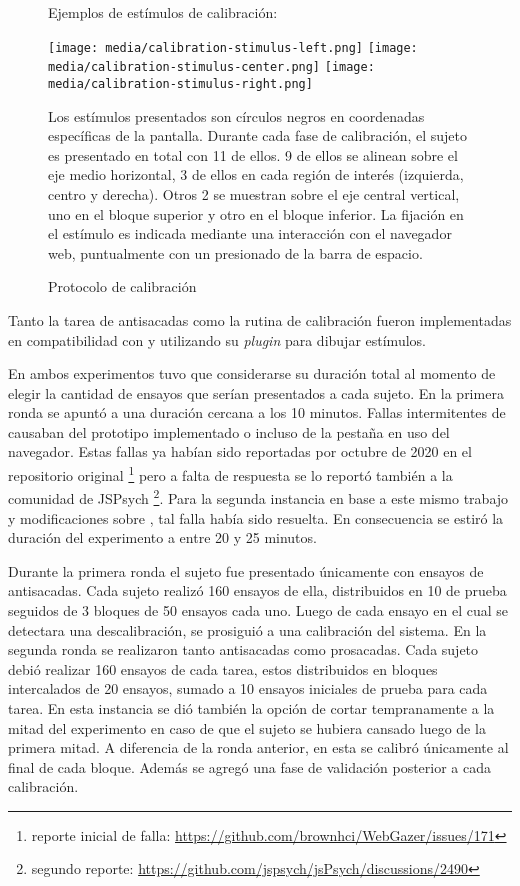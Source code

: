   \begin{figure}
    \centering

    Ejemplos de estímulos de calibración:

    \texttt{[image: media/calibration-stimulus-left.png]}
    \texttt{[image: media/calibration-stimulus-center.png]}
    \texttt{[image: media/calibration-stimulus-right.png]}

    Los estímulos presentados son círculos negros en coordenadas específicas de
    la pantalla.
    Durante cada fase de calibración, el sujeto es presentado en total con 11
    de ellos.
    9 de ellos se alinean sobre el eje medio horizontal, 3 de ellos en cada
    región de interés (izquierda, centro y derecha).
    Otros 2 se muestran sobre el eje central vertical, uno en el bloque
    superior y otro en el bloque inferior.
    La fijación en el estímulo es indicada mediante una interacción con el
    navegador web, puntualmente con un presionado de la barra de espacio.

    \caption{Protocolo de calibración}
    \label{fig:calibration-protocol}
  \end{figure}

  Tanto la tarea de antisacadas como la rutina de calibración fueron
  implementadas en compatibilidad con \jspsych y utilizando su \textit{plugin}
  \psychophysics para dibujar estímulos.

  En ambos experimentos tuvo que considerarse su duración total al momento de 
  elegir la cantidad de ensayos que serían presentados a cada sujeto.
  En la primera ronda se apuntó a una duración cercana a los 10 minutos.
  Fallas intermitentes de \webgazer causaban \crashes del prototipo implementado
  o incluso de la pestaña en uso del navegador.
  Estas fallas ya habían sido reportadas por octubre de 2020 en el repositorio
  original \footnote{reporte inicial de falla:
  \url{https://github.com/brownhci/WebGazer/issues/171}} pero a falta de
  respuesta se lo reportó también a la comunidad de JSPsych \footnote{segundo
  reporte: \url{https://github.com/jspsych/jsPsych/discussions/2490}}.
  Para la segunda instancia en base a este mismo trabajo y modificaciones sobre
  \webgazer, tal falla había sido resuelta.
  En consecuencia se estiró la duración del experimento a entre 20 y 25 minutos.

  Durante la primera ronda el sujeto fue presentado únicamente con ensayos de
  antisacadas.
  Cada sujeto realizó 160 ensayos de ella, distribuidos en 10 de prueba seguidos
  de 3 bloques de 50 ensayos cada uno.
  Luego de cada ensayo en el cual se detectara una descalibración, se prosiguió
  a una calibración del sistema.
  En la segunda ronda se realizaron tanto antisacadas como prosacadas.
  Cada sujeto debió realizar 160 ensayos de cada tarea, estos distribuidos en
  bloques intercalados de 20 ensayos, sumado a 10 ensayos iniciales de prueba
  para cada tarea.
  En esta instancia se dió también la opción de cortar tempranamente a la mitad
  del experimento en caso de que el sujeto se hubiera cansado luego de la primera
  mitad.
  A diferencia de la ronda anterior, en esta se calibró únicamente al final de
  cada bloque.
  Además se agregó una fase de validación posterior a cada calibración.

